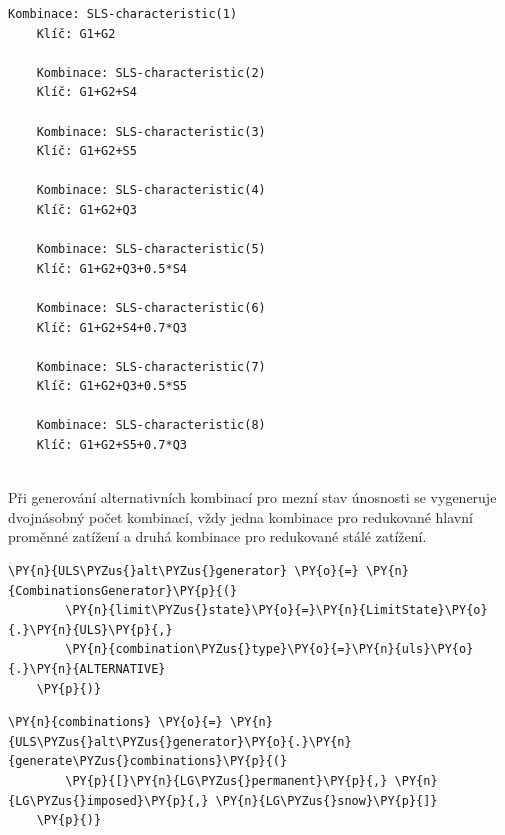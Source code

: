         \begin{Verbatim}[commandchars=\\\{\}]
    Kombinace: SLS-characteristic(1)
    Klíč: G1+G2
    
    Kombinace: SLS-characteristic(2)
    Klíč: G1+G2+S4
    
    Kombinace: SLS-characteristic(3)
    Klíč: G1+G2+S5
    
    Kombinace: SLS-characteristic(4)
    Klíč: G1+G2+Q3
    
    Kombinace: SLS-characteristic(5)
    Klíč: G1+G2+Q3+0.5*S4
    
    Kombinace: SLS-characteristic(6)
    Klíč: G1+G2+S4+0.7*Q3
    
    Kombinace: SLS-characteristic(7)
    Klíč: G1+G2+Q3+0.5*S5
    
    Kombinace: SLS-characteristic(8)
    Klíč: G1+G2+S5+0.7*Q3
    
        \end{Verbatim}
    
    Při generování alternativních kombinací pro mezní stav únosnosti se vygeneruje dvojnásobný počet kombinací, vždy jedna kombinace pro redukované hlavní proměnné zatížení a druhá kombinace pro redukované stálé zatížení.
        \begin{tcolorbox}[breakable, size=fbox, boxrule=1pt, pad at break*=1mm,colback=cellbackground, colframe=cellborder]
    \begin{Verbatim}[commandchars=\\\{\}]
    \PY{n}{ULS\PYZus{}alt\PYZus{}generator} \PY{o}{=} \PY{n}{CombinationsGenerator}\PY{p}{(}
        \PY{n}{limit\PYZus{}state}\PY{o}{=}\PY{n}{LimitState}\PY{o}{.}\PY{n}{ULS}\PY{p}{,}
        \PY{n}{combination\PYZus{}type}\PY{o}{=}\PY{n}{uls}\PY{o}{.}\PY{n}{ALTERNATIVE}
    \PY{p}{)}
    \end{Verbatim}
    \end{tcolorbox}
    
        \begin{tcolorbox}[breakable, size=fbox, boxrule=1pt, pad at break*=1mm,colback=cellbackground, colframe=cellborder]
    \begin{Verbatim}[commandchars=\\\{\}]
    \PY{n}{combinations} \PY{o}{=} \PY{n}{ULS\PYZus{}alt\PYZus{}generator}\PY{o}{.}\PY{n}{generate\PYZus{}combinations}\PY{p}{(}
        \PY{p}{[}\PY{n}{LG\PYZus{}permanent}\PY{p}{,} \PY{n}{LG\PYZus{}imposed}\PY{p}{,} \PY{n}{LG\PYZus{}snow}\PY{p}{]}
    \PY{p}{)}
    \end{Verbatim}
    \end{tcolorbox}
    
